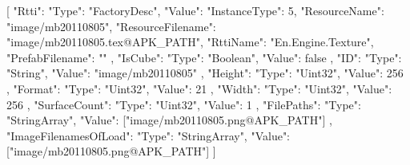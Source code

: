 [{
        "Rtti": {
            "Type": "FactoryDesc",
            "Value": {
                "InstanceType": 5,
                "ResourceName": "image/mb20110805",
                "ResourceFilename": "image/mb20110805.tex@APK_PATH",
                "RttiName": "En.Engine.Texture",
                "PrefabFilename": ""
            }
        },
        "IsCube": {
            "Type": "Boolean",
            "Value": false
        },
        "ID": {
            "Type": "String",
            "Value": "image/mb20110805"
        },
        "Height": {
            "Type": "Uint32",
            "Value": 256
        },
        "Format": {
            "Type": "Uint32",
            "Value": 21
        },
        "Width": {
            "Type": "Uint32",
            "Value": 256
        },
        "SurfaceCount": {
            "Type": "Uint32",
            "Value": 1
        },
        "FilePaths": {
            "Type": "StringArray",
            "Value": ["image/mb20110805.png@APK_PATH"]
        },
        "ImageFilenamesOfLoad": {
            "Type": "StringArray",
            "Value": ["image/mb20110805.png@APK_PATH"]
        }
    }]